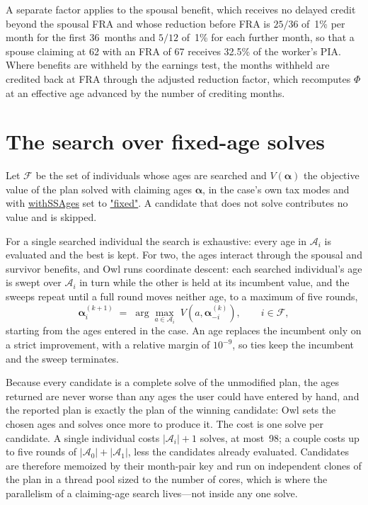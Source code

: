 \documentclass[fleqn,12pt]{report}
\newcommand{\code}[1]{\url{#1}}
\begin{document}
A separate factor applies to the spousal benefit, which receives no delayed
credit beyond the spousal FRA and whose reduction before FRA is $25/36$ of~1\%
per month for the first 36~months and $5/12$ of~1\% for each further month,
so that a spouse claiming at 62 with an FRA of 67 receives 32.5\% of the worker's PIA.
Where benefits are withheld by the earnings test, the months withheld are
credited back at FRA through the adjusted reduction factor, which recomputes
$\Phi$ at an effective age advanced by the number of crediting months.

\section{The search over fixed-age solves}
\label{sec:ss-search}

Let $\mathcal{F}$ be the set of individuals whose ages are searched and
$V(\bm{\alpha})$ the objective value of the plan solved with claiming ages
$\bm{\alpha}$, in the case's own tax modes and with \code{withSSAges} set to
\code{"fixed"}.
A candidate that does not solve contributes no value and is skipped.

For a single searched individual the search is exhaustive: every age in
$\mathcal{A}_i$ is evaluated and the best is kept.
For two, the ages interact through the spousal and survivor benefits, and Owl
runs coordinate descent: each searched individual's age is swept over
$\mathcal{A}_i$ in turn while the other is held at its incumbent value, and the
sweeps repeat until a full round moves neither age, to a maximum of five rounds,
\begin{equation}
    \label{Eq:SSAcoord}
    \bm{\alpha}^{(k+1)}_i \;=\;
    \arg\max_{a \in \mathcal{A}_i} \;
    V\!\left(a, \bm{\alpha}^{(k)}_{-i}\right),
    \qquad i \in \mathcal{F},
\end{equation}
starting from the ages entered in the case.
An age replaces the incumbent only on a strict improvement, with a relative
margin of $10^{-9}$, so ties keep the incumbent and the sweep terminates.

Because every candidate is a complete solve of the unmodified plan, the ages
returned are never worse than any ages the user could have entered by hand, and
the reported plan is exactly the plan of the winning candidate: Owl sets the
chosen ages and solves once more to produce it.
The cost is one solve per candidate.
A single individual costs $|\mathcal{A}_i| + 1$ solves, at most~98; a couple
costs up to five rounds of $|\mathcal{A}_0| + |\mathcal{A}_1|$, less the
candidates already evaluated.
Candidates are therefore memoized by their month-pair key and run on independent
clones of the plan in a thread pool sized to the number of cores, which is where
the parallelism of a claiming-age search lives---not inside any one solve.
\end{document}
